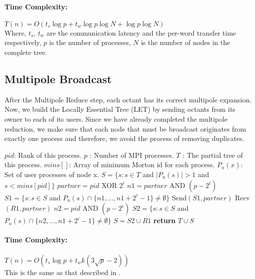 \documentclass[11pt]{article}
\begin{document}
\paragraph{Time Complexity:}
$T(n)=O(t_s \log p + t_w \log p \log N + \log p \log N)$ \\
Where, $t_s$, $t_w$ are the communication latency and the per-word transfer 
time respectively, $p$ is the number of processes, $N$ is the number of nodes 
in the complete tree.




\subsection{Multipole Broadcast}
After the Multipole Reduce step, each octant has its correct multipole 
expansion. Now, we build the Locally Essential Tree (LET) by sending octants 
from its owner to each of its users. Since we have already completed the 
multipole reduction, we make sure that each node that must be broadcast 
originates from exactly one process and therefore, we avoid the process of 
removing duplicates.

\begin{algorithm}[H]
\caption{$MULTIPOLE\_BROADCAST$}
\label{multipole_broadcast}
\begin{algorithmic}
  \STATE $pid$: Rank of this process.
  \STATE $p$ : Number of MPI processes.
  \STATE $T$  : The partial tree of this process.
  \STATE $mins[]$: Array of minimum Morton id for each process.
  \STATE $P_u(x)$: Set of user processes of node x.
  \STATE {}
  \STATE {}
  \STATE $S = \{s : s \in T$ and $\left|{P_u(s)}\right|>1$ and $s<mins[pid]\}$
    \STATE $partner = pid$ XOR $2^i$
    \STATE $n1 = partner$ AND $(p - 2^i)$
    \STATE $S1 = \{s : s \in S$ and $P_u(s) \cap \{n1,...,n1+2^i-1\} \neq \emptyset\}$
    \STATE Send$(S1,partner)$
    \STATE Recv$(R1,partner)$
    \STATE $n2 = pid$ AND $(p - 2^i)$
    \STATE $S2 = \{s : s \in S$ and $P_u(s) \cap \{n2,...,n1+2^i-1\} \neq \emptyset\}$
    \STATE $S = S2 \cup R1$
  \ENDFOR
  \STATE \textbf{return} $T \cup S$
\end{algorithmic}
\end{algorithm}

\paragraph{Time Complexity:}
$T(n)=O(t_s \log p + t_w k (3 \sqrt{p} - 2))$ \\
This is the same as that described in \cite{I_Lashuk_2009}.
\end{document}
